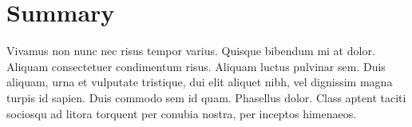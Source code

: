 \section{Summary}

Vivamus non nunc nec risus tempor varius. Quisque bibendum mi at
dolor. Aliquam consectetuer condimentum risus. Aliquam luctus pulvinar
sem. Duis aliquam, urna et vulputate tristique, dui elit aliquet nibh,
vel dignissim magna turpis id sapien. Duis commodo sem id
quam. Phasellus dolor. Class aptent taciti sociosqu ad litora torquent
per conubia nostra, per inceptos himenaeos. 
